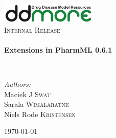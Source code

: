 \begin{titlepage}
\begin{center}

\includegraphics[width=0.35\textwidth]{./logo/ddmore_logo}~\\[1cm]

%
\textsc{\Large Internal Release}\\[0.5cm]

\HRule \\[0.4cm]
{ \huge \bfseries Extensions in PharmML 0.6.1 \\[0.4cm] }

\HRule \\[1.5cm]

\begin{minipage}{0.5\textwidth}
\begin{flushleft} \large
\emph{Authors:}\\
Maciek J \textsc{Swat}\\
Sarala \textsc{Wimalaratne}\\
Niels Rode \textsc{Kristensen}
\end{flushleft}
\end{minipage}



\vfill

{\large \today \\}

\end{center}
\end{titlepage}